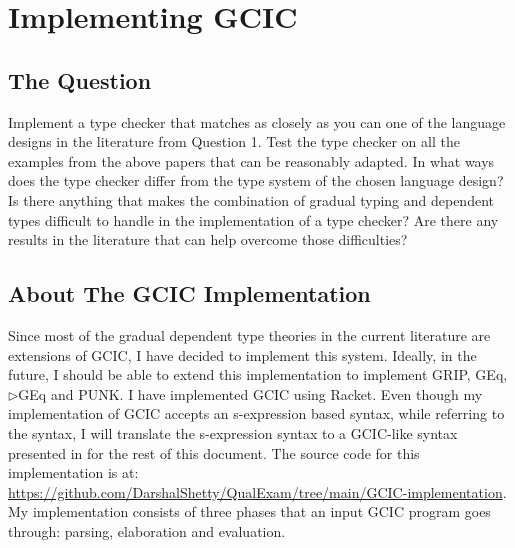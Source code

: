 \documentclass{article}
\theoremstyle{definition}
\newcommand{\GGEq}[0]{\(\triangleright\)GEq}
\begin{document}
\section{Implementing GCIC}\label{sec:question2}

\subsection{The Question}
Implement a type checker that matches as closely as you can one of the language
designs in the literature from Question 1. Test the type checker on all the
examples from the above papers that can be reasonably adapted. In what ways does
the type checker differ from the type system of the chosen language design? Is
there anything that makes the combination of gradual typing and dependent types
difficult to handle in the implementation of a type checker? Are there any
results in the literature that can help overcome those difficulties?

\subsection{About The GCIC Implementation}

Since most of the gradual dependent type theories in the current literature are
extensions of GCIC, I have decided to implement this system. Ideally, in the
future, I should be able to extend this implementation to implement GRIP, GEq,
\GGEq{} and PUNK. I have implemented GCIC using Racket. Even though my
implementation of GCIC accepts an s-expression based syntax, while referring to
the syntax, I will translate the s-expression syntax to a GCIC-like syntax
presented in \citet{lennon-bertrand_gradualizing_2022} for the rest of this
document. The source code for this implementation is at:
\url{https://github.com/DarshalShetty/QualExam/tree/main/GCIC-implementation}.
My implementation consists of three phases that an input GCIC program goes
through: parsing, elaboration and evaluation.
\end{document}
